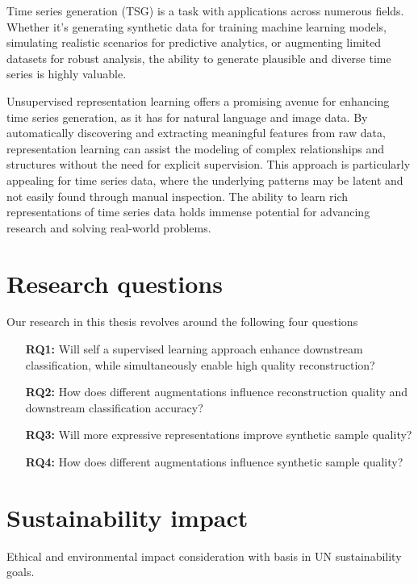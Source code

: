 \documentclass[../../thesis.tex]{subfiles}
\begin{document}
Time series generation (TSG) is a task with applications across numerous fields. Whether it's generating synthetic data for training machine learning models, simulating realistic scenarios for predictive analytics, or augmenting limited datasets for robust analysis, the ability to generate plausible and diverse time series is highly valuable.\newline

Unsupervised representation learning offers a promising avenue for enhancing time series generation, as it has for natural language and image data. By automatically discovering and extracting meaningful features from raw data, representation learning can assist the modeling of complex relationships and structures without the need for explicit supervision. This approach is particularly appealing for time series data, where the underlying patterns may be latent and not easily found through manual inspection. The ability to learn rich representations of time series data holds immense potential for advancing research and solving real-world problems.



\section{Research questions}

Our research in this thesis revolves around the following four questions
\begin{itemize}
	\item[\textbf{RQ1:}] Will self a supervised learning approach enhance downstream classification, while simultaneously enable high quality reconstruction?
	\item[\textbf{RQ2:}] How does different augmentations influence reconstruction quality and downstream classification accuracy? 
	\item[\textbf{RQ3:}] Will more expressive representations improve synthetic sample quality?
	\item[\textbf{RQ4:}] How does different augmentations influence synthetic sample quality?
\end{itemize}


\section{Sustainability impact}

Ethical and environmental impact consideration with basis in UN sustainability goals.
\end{document}
